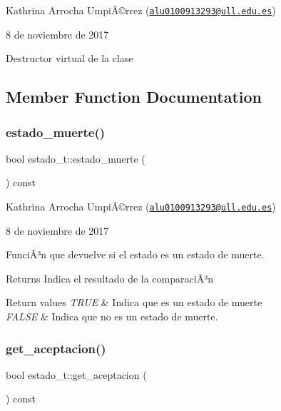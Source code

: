 Kathrina Arrocha UmpiÃ©rrez (\href{mailto:alu0100913293@ull.edu.es}{\tt alu0100913293@ull.\+edu.\+es})

8 de noviembre de 2017

Destructor virtual de la clase 

\subsection{Member Function Documentation}
\mbox{\label{classestado__t_a95a8cfda0f144b54f4b4ad205f25726c}} 
\subsubsection{\texorpdfstring{estado\+\_\+muerte()}{estado\_muerte()}}
{\footnotesize\ttfamily bool estado\+\_\+t\+::estado\+\_\+muerte (\begin{DoxyParamCaption}{ }\end{DoxyParamCaption}) const}

Kathrina Arrocha UmpiÃ©rrez (\href{mailto:alu0100913293@ull.edu.es}{\tt alu0100913293@ull.\+edu.\+es})

8 de noviembre de 2017

FunciÃ³n que devuelve si el estado es un estado de muerte.

\begin{DoxyReturn}{Returns}
Indica el resultado de la comparaciÃ³n 
\end{DoxyReturn}

\begin{DoxyRetVals}{Return values}
{\em T\+R\+UE} & Indica que es un estado de muerte \\
\hline
{\em F\+A\+L\+SE} & Indica que no es un estado de muerte. \\
\hline
\end{DoxyRetVals}
\mbox{\label{classestado__t_a82629cf1be67ef78156ac248cd57200d}} 
\subsubsection{\texorpdfstring{get\+\_\+aceptacion()}{get\_aceptacion()}}
{\footnotesize\ttfamily bool estado\+\_\+t\+::get\+\_\+aceptacion (\begin{DoxyParamCaption}{ }\end{DoxyParamCaption}) const}

